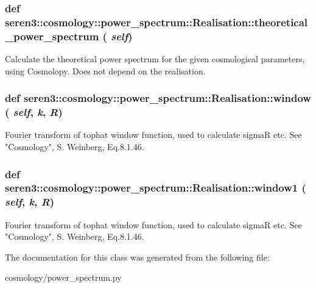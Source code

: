  \hypertarget{classseren3_1_1cosmology_1_1power__spectrum_1_1Realisation_a02f12b743f326436bd4b9a482e6f0596}{
\subsubsection[{theoretical\_\-power\_\-spectrum}]{\setlength{\rightskip}{0pt plus 5cm}def seren3::cosmology::power\_\-spectrum::Realisation::theoretical\_\-power\_\-spectrum ( {\em self})}}
\label{classseren3_1_1cosmology_1_1power__spectrum_1_1Realisation_a02f12b743f326436bd4b9a482e6f0596}
\begin{DoxyVerb}Calculate the theoretical power spectrum for the given cosmological 
   parameters, using Cosmolopy. Does not depend on the realisation.\end{DoxyVerb}
 \hypertarget{classseren3_1_1cosmology_1_1power__spectrum_1_1Realisation_ae1949bbd25d64f3e15751e4f78bf845d}{
\subsubsection[{window}]{\setlength{\rightskip}{0pt plus 5cm}def seren3::cosmology::power\_\-spectrum::Realisation::window ( {\em self}, \/   {\em k}, \/   {\em R})}}
\label{classseren3_1_1cosmology_1_1power__spectrum_1_1Realisation_ae1949bbd25d64f3e15751e4f78bf845d}
\begin{DoxyVerb}Fourier transform of tophat window function, used to calculate 
   sigmaR etc. See "Cosmology", S. Weinberg, Eq.8.1.46.\end{DoxyVerb}
 \hypertarget{classseren3_1_1cosmology_1_1power__spectrum_1_1Realisation_aba11124fa5b26227a07e4daa0413405a}{
\subsubsection[{window1}]{\setlength{\rightskip}{0pt plus 5cm}def seren3::cosmology::power\_\-spectrum::Realisation::window1 ( {\em self}, \/   {\em k}, \/   {\em R})}}
\label{classseren3_1_1cosmology_1_1power__spectrum_1_1Realisation_aba11124fa5b26227a07e4daa0413405a}
\begin{DoxyVerb}Fourier transform of tophat window function, used to calculate 
   sigmaR etc. See "Cosmology", S. Weinberg, Eq.8.1.46.\end{DoxyVerb}
 

The documentation for this class was generated from the following file:\begin{DoxyCompactItemize}
\item 
cosmology/power\_\-spectrum.py\end{DoxyCompactItemize}
